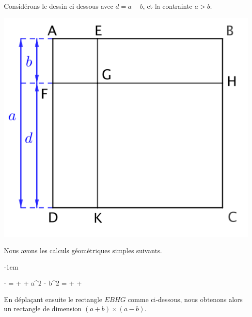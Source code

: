 \begin{example}
	Considérons le dessin ci-dessous avec $d = a - b$, et la contrainte $a > b$.

	\begin{center}
		\includegraphics[scale = .7]{(a-b)^2.png}
	\end{center}

	Nous avons les calculs géométriques simples suivants.

	\leavevmode\kern-1em%
	\begin{stepcalc}[style=ar*, ope={\iff}]
    	 -  =  +  + 
	\explnext{}
    	a^2 - b^2 =  +  + 
	\end{stepcalc}

	\newpage

	En déplaçant ensuite le rectangle $EBHG$ comme ci-dessous, nous obtenons alors un rectangle de dimension $(a+b) \times (a-b)$. 


\end{example}
